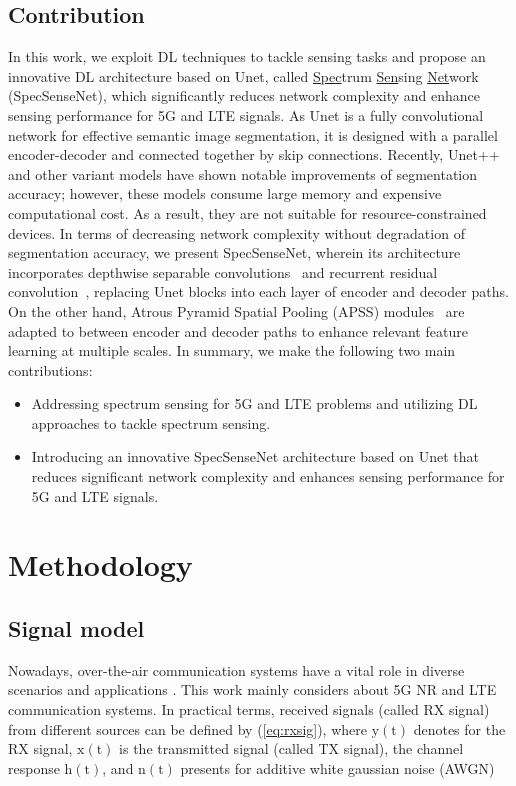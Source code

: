\documentclass[journal]{IEEEtran} %
\begin{document}
\subsection{Contribution}
In this work, we exploit DL techniques to tackle sensing tasks and propose an innovative DL architecture based on Unet, called \underline{Spec}trum \underline{Sen}sing \underline{Net}work (SpecSenseNet), which significantly reduces network complexity and enhance sensing performance for 5G and LTE signals. As Unet is a fully convolutional network \cite{ronneberger2015u} for effective semantic image segmentation, it is designed with a parallel encoder-decoder and connected together by skip connections. Recently, Unet++ and other variant models\cite{zhou2019unet++} have shown notable improvements of segmentation accuracy; however, these models consume large memory and expensive computational cost. As a result, they are not suitable for resource-constrained devices. In terms of decreasing network complexity without degradation of segmentation accuracy, we present SpecSenseNet, wherein its architecture incorporates depthwise separable convolutions~\cite{CholletXception} and recurrent residual convolution~\cite{AlomNuclei, he2016deep, aghalari2021brain}, replacing Unet blocks into each layer of encoder and decoder paths. On the other hand, Atrous Pyramid Spatial Pooling (APSS) modules~\cite{ChenAtrous} are adapted to between encoder and decoder paths to enhance relevant feature learning at multiple scales. In summary, we make the following two main contributions:
\begin{itemize}
\item Addressing spectrum sensing for 5G and LTE problems and utilizing DL approaches to tackle spectrum sensing.
\item Introducing an innovative SpecSenseNet architecture based on Unet that reduces significant network complexity and enhances sensing performance for 5G and LTE signals.
\end{itemize}


\section{Methodology}
\subsection{Signal model}
Nowadays, over-the-air communication systems have a vital role in diverse scenarios and applications \cite{lin20215g}. This work mainly considers about 5G NR and LTE communication systems. In practical terms, received signals (called RX signal) from different sources can be defined by (\ref{eq:rxsig}), where $\mathrm{y(t)}$ denotes for the RX signal, $\mathrm{x(t)}$ is the transmitted signal (called TX signal), the channel response $\mathrm{h(t)}$, and $\mathrm{n(t)}$ presents for additive white gaussian noise (AWGN) 
\end{document}
